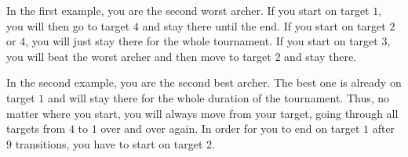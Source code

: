 In the first example, you are the second worst archer. If you start on target $1$, you will then go to target $4$ and stay there until the end. If you start on target $2$ or $4$, you will just stay there for the whole tournament. If you start on target $3$, you will beat the worst archer and then move to target $2$ and stay there. 

In the second example, you are the second best archer. The best one is already on target $1$ and will stay there for the whole duration of the tournament. Thus, no matter where you start, you will always move from your target, going through all targets from $4$ to $1$ over and over again. In order for you to end on target $1$ after $9$ transitions, you have to start on target $2$. 